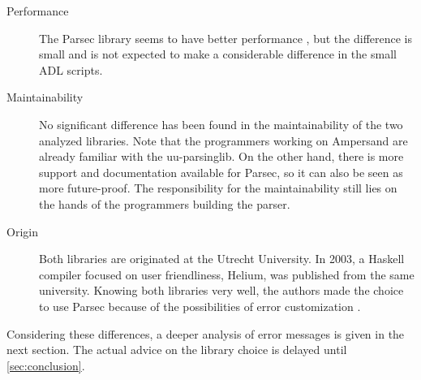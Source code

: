 \begin{description}
	\item[Performance] The Parsec library seems to have better performance , but the difference is small and is not expected to make a considerable difference in the small ADL scripts.
	\item[Maintainability] No significant difference has been found in the maintainability of the two analyzed libraries.
		Note that the programmers working on Ampersand are already familiar with the uu-parsinglib.
		On the other hand, there is more support and documentation available for Parsec, so it can also be seen as more future-proof.
		The responsibility for the maintainability still lies on the hands of the programmers building the parser.
	\item[Origin] Both libraries are originated at the Utrecht University.
		In 2003, a Haskell compiler focused on user friendliness, Helium, was published from the same university.
		Knowing both libraries very well, the authors made the choice to use Parsec because of the possibilities of error customization .
\end{description}
%
Considering these differences, a deeper analysis of error messages is given in the next section.
The actual advice on the library choice is delayed until \autoref{sec:conclusion}.
